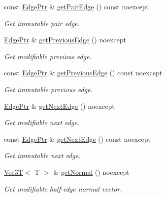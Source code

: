\begin{DoxyCompactItemize}
const \hyperlink{classDcel_1_1EdgeT_af525f4228d820f6b8b23fc02d937e4c8}{Edge\+Ptr} \& \hyperlink{classDcel_1_1EdgeT_a46f28f7da631e2d0f7f3139d1167b392}{get\+Pair\+Edge} () const noexcept
\begin{DoxyCompactList}\small\item\em Get immutable pair edge. \end{DoxyCompactList}\item 
\hyperlink{classDcel_1_1EdgeT_af525f4228d820f6b8b23fc02d937e4c8}{Edge\+Ptr} \& \hyperlink{classDcel_1_1EdgeT_ad97e2996c4559b8977d807a5627d5251}{get\+Previous\+Edge} () noexcept
\begin{DoxyCompactList}\small\item\em Get modifiable previous edge. \end{DoxyCompactList}\item 
const \hyperlink{classDcel_1_1EdgeT_af525f4228d820f6b8b23fc02d937e4c8}{Edge\+Ptr} \& \hyperlink{classDcel_1_1EdgeT_ae4baac4bda30dfa3827ea87f2f72481f}{get\+Previous\+Edge} () const noexcept
\begin{DoxyCompactList}\small\item\em Get immutable previous edge. \end{DoxyCompactList}\item 
\hyperlink{classDcel_1_1EdgeT_af525f4228d820f6b8b23fc02d937e4c8}{Edge\+Ptr} \& \hyperlink{classDcel_1_1EdgeT_a1c865581d60a3e89e91d1d8db56fc2d1}{get\+Next\+Edge} () noexcept
\begin{DoxyCompactList}\small\item\em Get modifiable next edge. \end{DoxyCompactList}\item 
const \hyperlink{classDcel_1_1EdgeT_af525f4228d820f6b8b23fc02d937e4c8}{Edge\+Ptr} \& \hyperlink{classDcel_1_1EdgeT_a6b50d3dd8ab3e2cda28819f6e4be9769}{get\+Next\+Edge} () const noexcept
\begin{DoxyCompactList}\small\item\em Get immutable next edge. \end{DoxyCompactList}\item 
\mbox{\label{classDcel_1_1EdgeT_a3caca2b8e0d73531566218a7febe24d8}} 
\hyperlink{classVec3T}{Vec3T}$<$ T $>$ \& \hyperlink{classDcel_1_1EdgeT_a3caca2b8e0d73531566218a7febe24d8}{get\+Normal} () noexcept
\begin{DoxyCompactList}\small\item\em Get modifiable half-\/edge normal vector. \end{DoxyCompactList}\item 

\end{DoxyCompactItemize}
